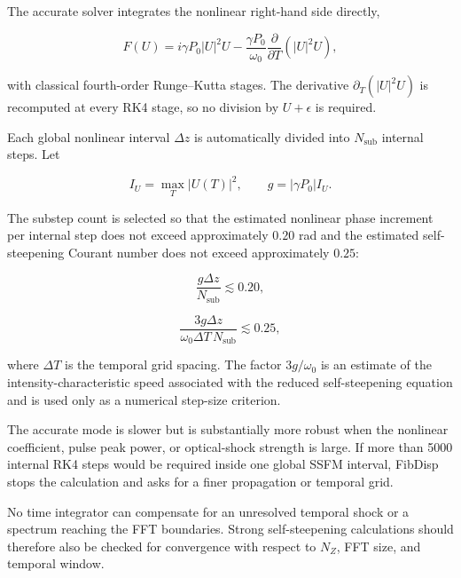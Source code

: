 \documentclass[11pt,a4paper]{article}
\begin{document}
The accurate solver integrates the nonlinear right-hand side directly,

\begin{equation}
F(U)
=
 i\gamma P_0|U|^2U
-
\frac{\gamma P_0}{\omega_0}
\frac{\partial}{\partial T}\left(|U|^2U\right),
\end{equation}

with classical fourth-order Runge--Kutta stages. The derivative
$\partial_T(|U|^2U)$ is recomputed at every RK4 stage, so no division by
$U+\epsilon$ is required.

Each global nonlinear interval $\Delta z$ is automatically divided into
$N_{\mathrm{sub}}$ internal steps. Let

\begin{equation}
I_U=\max_T |U(T)|^2,
\qquad
g=|\gamma P_0|I_U.
\end{equation}

The substep count is selected so that the estimated nonlinear phase increment
per internal step does not exceed approximately $0.20$ rad and the estimated
self-steepening Courant number does not exceed approximately $0.25$:

\begin{equation}
\frac{g\Delta z}{N_{\mathrm{sub}}}\lesssim0.20,
\end{equation}

\begin{equation}
\frac{3g\Delta z}
{\omega_0\Delta T\,N_{\mathrm{sub}}}
\lesssim0.25,
\end{equation}

where $\Delta T$ is the temporal grid spacing. The factor $3g/\omega_0$ is an
estimate of the intensity-characteristic speed associated with the reduced
self-steepening equation and is used only as a numerical step-size criterion.

The accurate mode is slower but is substantially more robust when the nonlinear
coefficient, pulse peak power, or optical-shock strength is large. If more than
5000 internal RK4 steps would be required inside one global SSFM interval,
FibDisp stops the calculation and asks for a finer propagation or temporal grid.

No time integrator can compensate for an unresolved temporal shock or a
spectrum reaching the FFT boundaries. Strong self-steepening calculations
should therefore also be checked for convergence with respect to $N_Z$, FFT
size, and temporal window.

\end{document}
